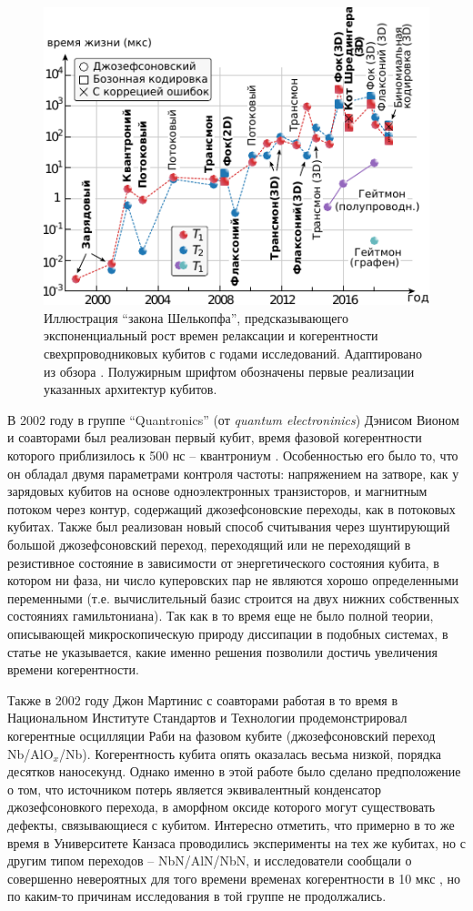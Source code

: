 \documentclass[14pt, a4paper]{extreport}
\numberwithin{equation}{section}
\begin{document}
\begin{figure}
	\centering
	\includegraphics[width=.8\linewidth]{shoelkopfs_law.pdf}
	\caption{Иллюстрация ``закона Шелькопфа'', предсказывающего экспоненциальный рост времен релаксации и когерентности свехрпроводниковых кубитов с годами исследований. Адаптировано из обзора \cite{kjaergaard2020superconducting}. Полужирным шрифтом обозначены первые реализации указанных архитектур кубитов.}
	\label{fig:shoelkopfslaw}
\end{figure}

В 2002 году в группе ``Quantronics'' (от \textit{quantum electroninics}) Дэнисом Вионом и соавторами был реализован первый кубит, время фазовой когерентности которого приблизилось к 500 нс -- квантрониум \cite{vion2002manipulating}. Особенностью его было то, что он обладал двумя параметрами контроля частоты: напряжением на затворе, как у зарядовых кубитов на основе одноэлектронных транзисторов, и магнитным потоком через контур, содержащий джозефсоновские переходы, как в потоковых кубитах. Также был реализован новый способ считывания через шунтирующий большой джозефсоновский переход, переходящий или не переходящий в резистивное состояние в зависимости от энергетического состояния кубита, в котором ни фаза, ни число куперовских пар не являются хорошо определенными переменными (т.е. вычислительный базис строится на двух нижних собственных состояниях гамильтониана). Так как в то время еще не было полной теории, описывающей микроскопическую природу диссипации в подобных системах, в статье не указывается, какие именно решения позволили достичь увеличения времени когерентности. 

Также в 2002 году Джон Мартинис с соавторами работая в то время в Национальном Институте Стандартов и Технологии продемонстрировал когерентные осцилляции Раби на фазовом кубите \cite{martinis2002rabi} (джозефсоновский переход Nb/AlO$_x$/Nb). Когерентность кубита опять оказалась весьма низкой, порядка десятков наносекунд. Однако именно в этой работе было сделано предположение о том, что источником потерь является эквивалентный конденсатор джозефсоновкого перехода, в аморфном оксиде которого могут существовать дефекты, связывающиеся с кубитом. Интересно отметить, что примерно в то же время в Университете Канзаса проводились эксперименты на тех же кубитах, но с другим типом переходов -- NbN/AlN/NbN, и исследователи сообщали о совершенно невероятных для того времени временах когерентности в 10 мкс \cite{han2001time}, но по каким-то причинам исследования в той группе не продолжались.
\end{document}
